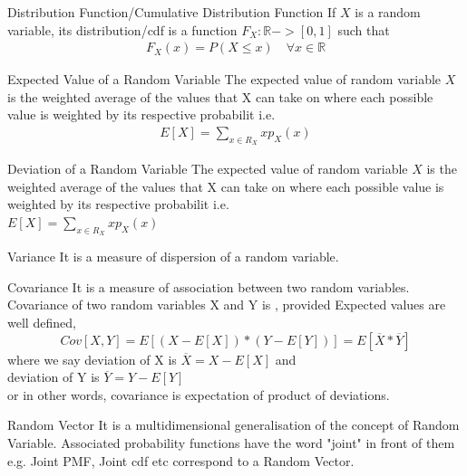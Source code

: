 \documentclass[10pt,a4paper]{article}
\newcommand{\R}{\mathbb{R}}
\begin{document}
	\begin{defn}{Distribution Function/Cumulative Distribution Function}
		If $X$ is a random variable, its distribution/cdf is a function $F_X : \R -> [0,1]$ such that \\
		\begin{align}
			F_X(x) = P(X \le x) \quad \forall x \in \R
		\end{align}
	\end{defn}

	\begin{defn}{Expected Value of a Random Variable}
	The expected value of random variable $X$ is the weighted average of the values that X can take on where each possible value is weighted by its respective probabilit i.e. \\
	\begin{align}
		E[X] = \sum\limits_{x \in R_X}xp_X(x)
	\end{align}
	\end{defn}

	\begin{defn}{Deviation of a Random Variable}
	The expected value of random variable $X$ is the weighted average of the values that X can take on where each possible value is weighted by its respective probabilit i.e. \\
	$E[X] = \sum\limits_{x \in R_X}xp_X(x)$
	\end{defn}

	\begin{defn}{Variance}
		It is a measure of dispersion of a random variable.
	\end{defn}

	\begin{defn}{Covariance}
	It is a measure of association between two random variables.
	Covariance of two random variables X and Y is , provided Expected values are well defined,
	\begin{equation}
		Cov[X,Y] = E[ (X - E[X]) * (Y - E[Y]) ] = E[\overline{X} * \overline{Y}]
	\end{equation}
	where we say deviation of X is $\overline{X} = X - E[X]$ and \\
	deviation of Y is $\overline{Y} = Y - E[Y]$\\
	or in other words, covariance is expectation of product of deviations.
	\end{defn}

	\begin{defn}{Random Vector}
	It is a multidimensional generalisation of the concept of Random Variable. Associated probability functions have the word "joint" in front of them e.g. Joint PMF, Joint cdf etc correspond to a Random Vector.
	\end{defn}
\end{document}
